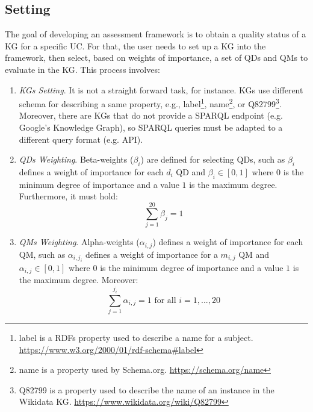 \documentclass[runningheads]{llncs}
\begin{document}
\subsection{Setting}
The goal of developing an assessment framework is to obtain a quality status of a KG for a specific UC. For that, the user needs to set up a KG into the framework, then select, based on weights of importance, a set of QDs and QMs to evaluate in the KG. This process involves:
\begin{enumerate}
    \item[i.] \textit{KGs Setting}. It is not a straight forward task, for instance. KGs use different schema for describing a same property, e.g., label\footnote{label is a RDFs property used to describe a name for a subject. \url{https://www.w3.org/2000/01/rdf-schema\#label}}, name\footnote{name is a property used by Schema.org. \url{https://schema.org/name}}, or Q82799\footnote{Q82799 is a property used to describe the name of an instance in the Wikidata KG. \url{https://www.wikidata.org/wiki/Q82799}}. Moreover, there are KGs that do not provide a SPARQL endpoint (e.g. Google's Knowledge Graph), so SPARQL queries must be adapted to a different query format (e.g. API).
    \item[ii.] \textit{QDs Weighting}. Beta-weights (\(  \beta_{i} \)) are defined for selecting QDs, such as \(  \beta_{i} \) defines a weight of importance for each \( d_{i} \) QD and \(  \beta_{i} \in  \left[ 0,1 \right]  \) where \( 0 \) is the minimum degree of importance and a value \( 1 \) is the maximum degree. Furthermore, it must hold:
%   
\[ \sum _{j=1}^{20} \beta _{j}=1  \] 
%
    \item[iii.] \textit{QMs Weighting}. Alpha-weights (\( \alpha_{i,j} \)) defines a weight of importance for each QM, such as \( \alpha_{i,j_{i}} \) defines a weight of importance for a \( m_{i,j} \) QM and \( \alpha_{i,j} \in  \left[ 0,1 \right]  \) where \( 0 \) is the minimum degree of importance and a value \( 1 \) is the maximum degree. Moreover:
%   
\[ \sum _{j=1}^{j_{i}}\alpha_{i,j}=1  \textrm{ for all } i = 1, ... , 20 \] 
%    
\end{enumerate}
\end{document}
